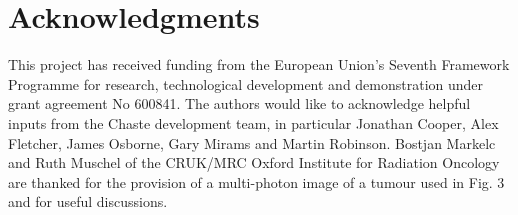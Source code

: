 \documentclass[10pt,letterpaper]{article}
\begin{document}
\section*{Acknowledgments}

This project has received funding from the European Union's Seventh Framework Programme
for research, technological development and demonstration 
under grant agreement No 600841. The authors would like to acknowledge 
helpful inputs from the Chaste development team, in particular Jonathan Cooper, Alex Fletcher, James Osborne, Gary Mirams and Martin Robinson. Bostjan Markelc and Ruth Muschel of the CRUK/MRC Oxford Institute for Radiation Oncology are thanked for the provision of a multi-photon image of a tumour used in Fig. 3 and for useful discussions.

\nolinenumbers
\end{document}

